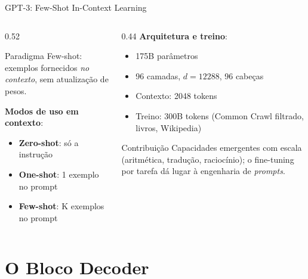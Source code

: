 \documentclass[aspectratio=169, xcolor=dvipsnames]{beamer}
\begin{document}
  \begin{frame}{GPT-3: Few-Shot In-Context Learning\footnotemark[1]}
    \begin{columns}[T]
      \begin{column}{0.52\textwidth}
        \begin{block}{Paradigma}
          Few-shot: exemplos fornecidos \textit{no contexto}, sem atualização de pesos.
        \end{block}
        \vspace{0.3em}
        \textbf{Modos de uso em contexto}:
        \begin{itemize}
          \item \textbf{Zero-shot}: só a instrução
          \item \textbf{One-shot}: 1 exemplo no prompt
          \item \textbf{Few-shot}: K exemplos no prompt
        \end{itemize}
      \end{column}
      \begin{column}{0.44\textwidth}
        \textbf{Arquitetura e treino}:
        \begin{itemize}
          \item 175B parâmetros
          \item 96 camadas, $d=12288$, 96 cabeças
          \item Contexto: 2048 tokens
          \item Treino: 300B tokens (Common Crawl filtrado, livros, Wikipedia)
        \end{itemize}
        \vspace{0.3em}
        \begin{exampleblock}{Contribuição}
          Capacidades emergentes com escala (aritmética, tradução, raciocínio); o fine-tuning por tarefa dá lugar à engenharia de \textit{prompts}.
        \end{exampleblock}
      \end{column}
    \end{columns}
  \end{frame}

  \section{O Bloco Decoder}
\end{document}
